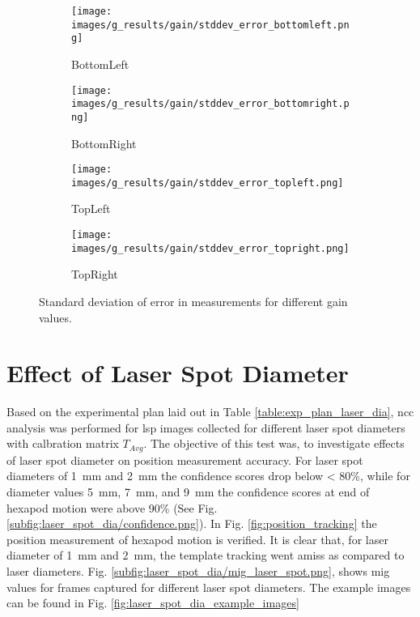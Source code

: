     \clearpage

    \begin{figure}[ht]
        \centering
        \begin{subfigure}[b]{0.46\textwidth}
            \centering
            \texttt{[image: images/g\_results/gain/stddev\_error\_bottomleft.png]}
            \caption{\textsf{BottomLeft}}
        \end{subfigure}
        \hspace{1cm}
        \begin{subfigure}[b]{0.46\textwidth}
            \centering
            \texttt{[image: images/g\_results/gain/stddev\_error\_bottomright.png]}
            \caption{\textsf{BottomRight}}
        \end{subfigure}

        \vspace{5mm}
        
        \begin{subfigure}[b]{0.46\textwidth}
            \centering
            \texttt{[image: images/g\_results/gain/stddev\_error\_topleft.png]}
            \caption{\textsf{TopLeft}}
        \end{subfigure}
        \hspace{1cm}
        \begin{subfigure}[b]{0.46\textwidth}
            \centering
            \texttt{[image: images/g\_results/gain/stddev\_error\_topright.png]}
            \caption{\textsf{TopRight}}
        \end{subfigure}

        \caption{Standard deviation of error in measurements for different gain values.}
        \label{fig:stddev_error_gain}
    \end{figure}

\section{Effect of Laser Spot Diameter}\label{section:laser_spot_dia}

    Based on the experimental plan laid out in Table \ref{table:exp_plan_laser_dia}, \gls{ncc} analysis was performed for \gls{lsp} images collected for different laser spot diameters with calbration matrix $T_{Avg}$. The objective of this test was, to investigate effects of laser spot diameter on position measurement accuracy. For laser spot diameters of \SI{1}{\milli\meter} and \SI{2}{\milli\meter} the confidence scores drop below < 80\%, while for diameter values \SI{5}{\milli\meter}, \SI{7}{\milli\meter}, and \SI{9}{\milli\meter} the confidence scores at end of hexapod motion were above 90\% (See Fig. \ref{subfig:laser_spot_dia/confidence.png}). In Fig. \ref{fig:position_tracking} the position measurement of hexapod motion is verified. It is clear that, for laser diameter of \SI{1}{\milli\meter} and \SI{2}{\milli\meter}, the template tracking went amiss as compared to laser diameters. Fig. \ref{subfig:laser_spot_dia/mig_laser_spot.png}, shows \gls{mig} values for frames captured for different laser spot diameters. The example images can be found in Fig. \ref{fig:laser_spot_dia_example_images}

